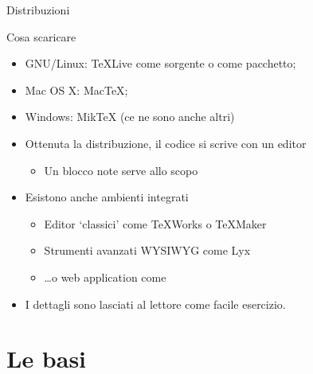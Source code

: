 \documentclass{beamer}
\begin{document}
\begin{frame}{Distribuzioni}

\begin{block}{Cosa scaricare}

\begin{itemize}
\item GNU/Linux: \TeX{}Live come sorgente o come pacchetto;
\item Mac OS X: Mac\TeX{};
\item Windows: Mik\TeX{} (ce ne sono anche altri)
\end{itemize}
\end{block}

\begin{itemize}
\item Ottenuta la distribuzione, il codice si scrive con un editor
	\begin{itemize}
	\item Un  blocco note serve allo scopo
	\end{itemize}
\item Esistono anche ambienti integrati
	\begin{itemize}
	\item Editor `classici' come \TeX{}Works o \TeX{}Maker
	\item Strumenti avanzati WYSIWYG come Lyx
	\item \ldots o web application come \wllogo
	\end{itemize}
\item I dettagli sono lasciati al lettore come \alert{facile} esercizio.
\end{itemize}

\end{frame}

\section{Le basi}

\end{document}
